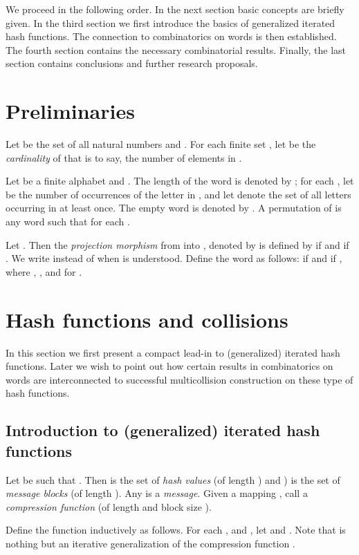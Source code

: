 \documentclass[submission,copyright,creativecommons]{eptcs}
\begin{document}
We proceed in the following order. In the next section basic concepts are briefly given. In the third section we first introduce the basics of generalized iterated hash functions. The connection to combinatorics on words is then established. The fourth section contains the necessary combinatorial results. Finally, the last section contains conclusions and further research proposals.


\section{Preliminaries}

Let  be the set of all natural numbers and . For each finite set , let  be the \textit{cardinality} of  that is to say, the number of elements in .

Let  be a finite alphabet and . The length of the word  is denoted
by ; for each , let  be the number of occurrences of the letter
 in , and let  denote the set of all letters occurring in  at
least once. The empty word is denoted by . A permutation of  is any word  such that  for each .

Let . Then the \textit{projection morphism} from  into , denoted by   is defined by  if  and  if . We write  instead of  when  is understood. Define the word  as follows:  if  and  if , where , , and  for .

\section{Hash functions and collisions}

In this section we first present a  compact lead-in  to (generalized) iterated hash functions. Later we wish to point out how certain results in  combinatorics on words are interconnected to successful multicollision construction on these type of hash functions. 

\subsection{Introduction to (generalized) iterated hash functions}\label{bc2}

Let  be such that . Then  is the set of \textit{hash values} (of length ) and ) is the set of \textit{message blocks} (of length ). Any  is a \textit{message}. Given a mapping  , call  a \textit{compression function} (of length  and block size ).  

Define the function    inductively as follows. For each ,  and , let  and
. Note that  is nothing but an iterative generalization of the compression function .
\end{document}
